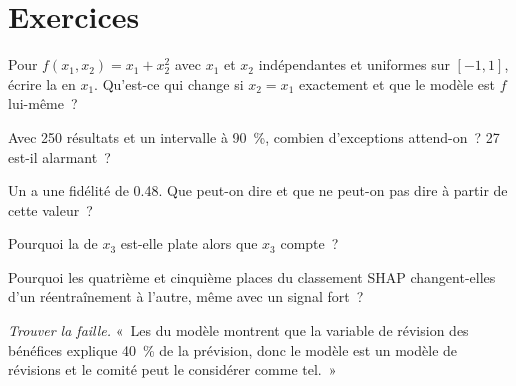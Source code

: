 \section{Exercices}

\begin{exercise}[$\star$]\label{exo:ml:interpretability-and-model-governance:1}
Pour $f(x_1, x_2) = x_1 + x_2^2$ avec $x_1$ et $x_2$ indépendantes et uniformes sur $[-1, 1]$, écrire la  en
$x_1$. Qu'est-ce qui change si $x_2 = x_1$ exactement et que le modèle est $f$ lui-même~?
\end{exercise}

\begin{exercise}[$\star$]\label{exo:ml:interpretability-and-model-governance:2}
Avec 250 résultats et un intervalle à 90~\%, combien d'exceptions attend-on~? 27 est-il alarmant~?
\end{exercise}

\begin{exercise}[$\star$]\label{exo:ml:interpretability-and-model-governance:3}
Un  a une fidélité de 0.48. Que peut-on dire et que ne peut-on pas dire à partir de cette valeur~?
\end{exercise}

\begin{exercise}[$\star\star$]\label{exo:ml:interpretability-and-model-governance:4}
Pourquoi la  de $x_3$ est-elle plate alors que $x_3$ compte~?
\end{exercise}

\begin{exercise}[$\star\star$]\label{exo:ml:interpretability-and-model-governance:5}
Pourquoi les quatrième et cinquième places du classement SHAP changent-elles d'un réentraînement à l'autre, même avec un signal fort~?
\end{exercise}

\begin{exercise}[$\star\star$]\label{exo:ml:interpretability-and-model-governance:6}
\emph{Trouver la faille.} «~Les  du modèle montrent que la variable de révision des bénéfices explique 40~\% de la prévision, donc le
modèle est un modèle de révisions et le comité peut le considérer comme tel.~»
\end{exercise}

